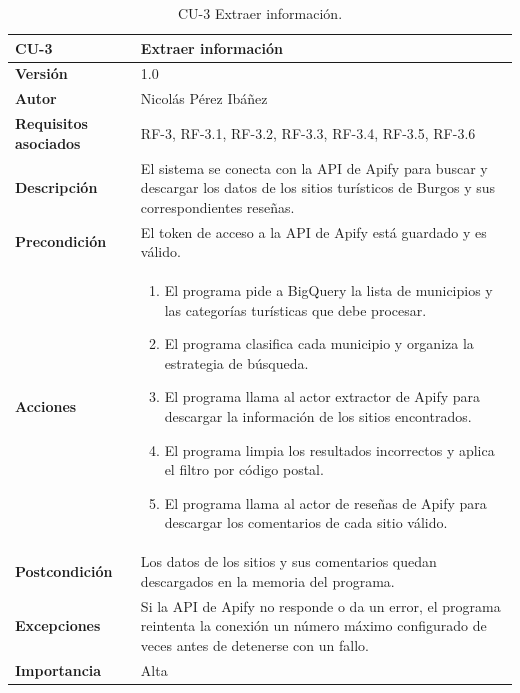 \begin{table}[p]
	\centering
	\begin{tabularx}{\linewidth}{ p{} p{} }
		\toprule
		\textbf{CU-3}    & \textbf{Extraer información}\\
		\toprule
		\textbf{Versión}              & 1.0    \\
		\textbf{Autor}                & Nicolás Pérez Ibáñez \\
		\textbf{Requisitos asociados} & RF-3, RF-3.1, RF-3.2, RF-3.3, RF-3.4, RF-3.5, RF-3.6 \\
		\textbf{Descripción}          & El sistema se conecta con la API de Apify para buscar y descargar los datos de los sitios turísticos de Burgos y sus correspondientes reseñas. \\
		\textbf{Precondición}         & El token de acceso a la API de Apify está guardado y es válido. \\
		\textbf{Acciones}             &
		\begin{enumerate}
			\def\labelenumi{\arabic{enumi}.}
			\tightlist
			\item El programa pide a BigQuery la lista de municipios y las categorías turísticas que debe procesar.
			\item El programa clasifica cada municipio y organiza la estrategia de búsqueda.
			\item El programa llama al actor extractor de Apify para descargar la información de los sitios encontrados.
			\item El programa limpia los resultados incorrectos y aplica el filtro por código postal.
			\item El programa llama al actor de reseñas de Apify para descargar los comentarios de cada sitio válido.
		\end{enumerate}\\
		\textbf{Postcondición}        & Los datos de los sitios y sus comentarios quedan descargados en la memoria del programa. \\
		\textbf{Excepciones}          & Si la API de Apify no responde o da un error, el programa reintenta la conexión un número máximo configurado de veces antes de detenerse con un fallo. \\
		\textbf{Importancia}          & Alta \\
		\bottomrule
	\end{tabularx}
	\caption{CU-3 Extraer información.}
\end{table}

